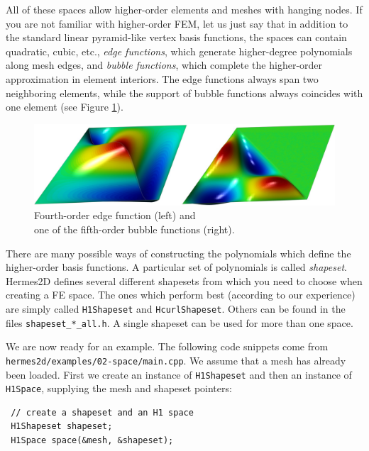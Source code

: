   
All of these spaces allow higher-order elements and meshes with hanging nodes.
If you are not familiar with higher-order FEM, let us just say that in addition
to the standard linear pyramid-like vertex basis functions, the spaces can contain
quadratic, cubic, etc., {\em edge functions}, which generate higher-degree
polynomials along mesh edges, and {\em bubble functions}, which complete the higher-order
approximation in element interiors. The edge functions always span two neighboring
elements, while the support of bubble functions always coincides with
one element (see Figure \ref{fig:basisfn}).

\begin{figure}[ht]
  \centering\bigskip
  \includegraphics[width=\textwidth]{img/basisfn.jpg}
  \caption{\centering Fourth-order edge function (left) and \\
           one of the fifth-order bubble functions (right).}
  \label{fig:basisfn}
\end{figure}

There are many possible ways of constructing the polynomials which define the
higher-order basis functions. A particular set of polynomials is called
\emph{shapeset}. Hermes2D defines several different shapesets from which
you need to choose when creating a FE space. The ones which perform best
(according to our experience) are simply called {\tt H1Shapeset} and {\tt HcurlShapeset}.
Others can be found in the files {\tt shapeset\_*\_all.h}. A single shapeset
can be used for more than one space.

We are now ready for an example. The following code snippets come from
\verb"hermes2d/examples/02-space/main.cpp". We assume that a mesh has already
been loaded. First we create an instance of {\tt H1Shapeset} and then an
instance of {\tt H1Space}, supplying the mesh and shapeset pointers:

\begin{lstlisting}
 // create a shapeset and an H1 space
 H1Shapeset shapeset;
 H1Space space(&mesh, &shapeset);
\end{lstlisting}

